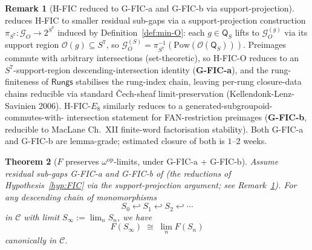 \documentclass[11pt, a4paper]{amsart}
\newtheorem{theorem}{Theorem}[section]
\theoremstyle{definition}
\newtheorem{remark}[theorem]{Remark}
\newcommand{\Rungs}{\mathsf{Rungs}}
\newcommand{\catC}{\mathcal{C}}
\newcommand{\Gcal}{\mathcal{G}}
\newcommand{\Qalg}{\mathsf{Q}}
\begin{document}
\begin{remark}[H-FIC reduced to G-FIC-a and G-FIC-b via
  support-projection]
\label{rmk:FIC-derivation-route}
\cite{CascadeHFICClosure} reduces H-FIC to smaller residual
sub-gaps via a support-projection construction
$\pi_{S^7} \colon \Gcal_O \to 2^{S^7}$ induced by
Definition~\ref{def:min-O}: each $g \in \Qalg_S$ lifts to
$\Gcal_O^{(g)}$ via its support region $\mathcal{O}(g)
\subseteq S^7$, so $\Gcal_O^{(S)} =
\pi_{S^7}^{-1}(\mathrm{Pow}(\mathcal{O}(\Qalg_S)))$. Preimages
commute with arbitrary intersections (set-theoretic), so
H-FIC-O reduces to an $S^7$-support-region descending-intersection
identity (\textbf{G-FIC-a}), and the rung-finiteness of
$\Rungs$ stabilises the rung-index chain, leaving per-rung
closure-data chains reducible via standard Čech-sheaf
limit-preservation (Kellendonk-Lenz-Savinien 2006). H-FIC-$E_8$
similarly reduces to a generated-subgroupoid-commutes-with-
intersection statement for FAN-restriction preimages
(\textbf{G-FIC-b}, reducible to MacLane Ch.~XII finite-word
factorisation stability). Both G-FIC-a and G-FIC-b are
lemma-grade; estimated closure of both is $1$--$2$ weeks.
\end{remark}

\begin{theorem}[$F$ preserves $\omega^{\mathrm{op}}$-limits,
  under G-FIC-a + G-FIC-b]
\label{thm:F-limits}
Assume residual sub-gaps G-FIC-a and G-FIC-b of
\cite{CascadeHFICClosure} (the reductions of
Hypothesis~\ref{hyp:FIC} via the support-projection argument;
see Remark~\ref{rmk:FIC-derivation-route}). For any descending
chain of monomorphisms
\[
    S_0 \hookleftarrow{} S_1 \hookleftarrow{} S_2
      \hookleftarrow{} \cdots
\]
in $\catC$ with limit $S_\infty := \lim_n S_n$, we have
\[
    F(S_\infty) \;\cong\; \lim_n F(S_n)
\]
canonically in $\catC$.
\end{theorem}
\end{document}
